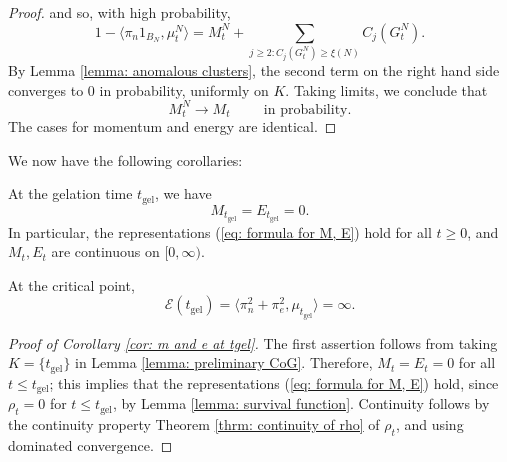 \begin{proof}
and so, with high probability, \begin{equation}
    1-\langle \pi_n1_{B_N},\mu^N_t\rangle = M^N_t + \sum_{j\geq 2: C_j(G^N_t)\geq \xi(N)} C_j(G^N_t).
\end{equation} By Lemma \ref{lemma: anomalous clusters}, the second term on the right hand side converges to $0$ in probability, uniformly on $K$. Taking limits, we conclude that \begin{equation}
    M^N_t \rightarrow M_t \hspace{1cm} \text{in probability}.
\end{equation} The cases for momentum and energy are identical.\end{proof} We now have the following corollaries: \begin{corollary} \label{cor: m and e at tgel}At the gelation time $t_\text{gel}$, we have \begin{equation}
    M_{t_\text{gel}}=E_{t_\text{gel}}=0.
\end{equation} In particular, the representations (\ref{eq: formula for M, E}) hold for all $t\geq 0$, and $M_t, E_t$ are continuous on $[0, \infty)$. \end{corollary} \begin{corollary} At the critical point, \begin{equation}
    \mathcal{E}(t_\text{gel})=\langle \pi_n^2+\pi_e^2, \mu_{t_\text{gel}}\rangle =\infty.
\end{equation} \end{corollary}
\begin{proof}[Proof of Corollary \ref{cor: m and e at tgel}] The first assertion follows from taking $K=\{t_\text{gel}\}$ in Lemma \ref{lemma: preliminary CoG}. Therefore, $M_t=E_t=0$ for all $t\leq t_\text{gel}$; this implies that the representations (\ref{eq: formula for M, E}) hold, since $\rho_t=0$ for $t\leq t_\text{gel}$, by Lemma \ref{lemma: survival function}. Continuity follows by the continuity property Theorem \ref{thrm: continuity of rho} of $\rho_t$, and using dominated convergence.   \end{proof}
